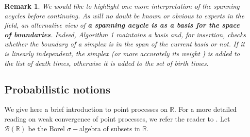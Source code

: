 \documentclass[12pt]{amsart}
\newcommand{\red}[1]{\textcolor{red}{#1}}
\newcommand{\gt}[1]{\textcolor{blue}{#1}}
\newcommand{\remove}[1]{}
\renewcommand{\red}[1]{#1}
\renewcommand{\gt}[1]{#1}
\newtheorem{definition}[theorem]{Definition}
\newtheorem{remark}[theorem]{Remark}
\numberwithin{equation}{section}
\numberwithin{theorem}{section}
\newcommand{\Real}{\mathbb R}
\newcommand{\1}{\mathbf{1}}
\def\bR{\mathbb{R}}
\def\borR{\mathcal{B}(\mathbb{R})}
\begin{document}
\red{
\begin{remark}
We would like to highlight one more interpretation of the spanning acycles before continuing. As will no doubt be known or obvious to experts in the field, an alternative view of \textbf{a spanning acycle is as a basis for the space of boundaries}. Indeed, Algorithm 1 maintains a basis and, for insertion, checks whether the boundary of a simplex is in the span of the current basis or not. If it \gt{is} linearly independent, the simplex (or more accurately its \gt{weight} \remove{boundary}) \gt{is added to the list of death times, otherwise it is added to the set of birth times.} \remove{ otherwise it does not. }
\end{remark}}



\subsection{Probabilistic notions}
\label{sec:probability}

We give here a brief introduction to point processes on $\Real$. For a more detailed reading on weak convergence of point processes, we refer the reader to \cite[Chapter 3]{resnick2013extreme}. Let $\borR$ be the Borel $\sigma-$algebra of subsets in $\bR.$

\remove{ \begin{definition}
For $x \in \bR$ and $A \in \borR,$ define
\[
\delta_{x}(A) =
\begin{cases}
1 & \text{ if $ x \in A$,}\\
0 & \text{ otherwise.}
\end{cases}
\]
Then the function $m: \borR \to \mathbb{Z}_{\geq 0}$ given by
\[
m(\cdot) = \sum_{i = 1}^{\infty} \delta_{x_i} (\cdot),
\]
where $\{x_i\}$ is some countable (possibly finite) collection of points in $\bR$ such that $m(K) < \infty$ for every compact set $K
\in \borR,$ denotes a {\em point measure} on $\bR.$  A point measure is {\em simple} if $m(\{x\}) \leq 1$ for each
$x \in \bR.$
\end{definition}
}
\end{document}
